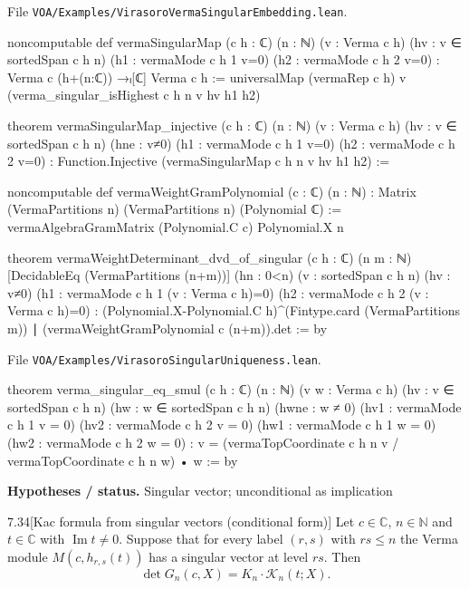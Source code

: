 \documentclass[11pt,openany]{book}
\newcommand{\leanpath}[1]{\texttt{\small #1}}
\theoremstyle{definition}
\theoremstyle{plain}
\newcommand{\C}{{\mathbb{C}}}
\newcommand{\N}{{\mathbb{N}}}
\begin{document}
{\raggedright\noindent File \leanpath{VOA/\allowbreak Examples/\allowbreak VirasoroVermaSingularEmbedding.lean}.\par}
\begin{leancode}
noncomputable def vermaSingularMap (c h : ℂ) (n : ℕ) (v : Verma c h)
    (hv : v ∈ sortedSpan c h n)
    (h1 : vermaMode c h 1 v=0) (h2 : vermaMode c h 2 v=0) :
    Verma c (h+(n:ℂ)) →ₗ[ℂ] Verma c h :=
  universalMap (vermaRep c h) v (verma_singular_isHighest c h n v hv h1 h2)

theorem vermaSingularMap_injective (c h : ℂ) (n : ℕ) (v : Verma c h)
    (hv : v ∈ sortedSpan c h n) (hne : v≠0)
    (h1 : vermaMode c h 1 v=0) (h2 : vermaMode c h 2 v=0) :
    Function.Injective (vermaSingularMap c h n v hv h1 h2) :=

noncomputable def vermaWeightGramPolynomial (c : ℂ) (n : ℕ) :
    Matrix (VermaPartitions n) (VermaPartitions n) (Polynomial ℂ) :=
  vermaAlgebraGramMatrix (Polynomial.C c) Polynomial.X n

theorem vermaWeightDeterminant_dvd_of_singular (c h : ℂ) (n m : ℕ)
    [DecidableEq (VermaPartitions (n+m))] (hn : 0<n)
    (v : sortedSpan c h n) (hv : v≠0)
    (h1 : vermaMode c h 1 (v : Verma c h)=0)
    (h2 : vermaMode c h 2 (v : Verma c h)=0) :
    (Polynomial.X-Polynomial.C h)^(Fintype.card (VermaPartitions m)) ∣
      (vermaWeightGramPolynomial c (n+m)).det := by
\end{leancode}
{\raggedright\noindent File \leanpath{VOA/\allowbreak Examples/\allowbreak VirasoroSingularUniqueness.lean}.\par}
\begin{leancode}
theorem verma_singular_eq_smul (c h : ℂ) (n : ℕ) (v w : Verma c h)
    (hv : v ∈ sortedSpan c h n) (hw : w ∈ sortedSpan c h n) (hwne : w ≠ 0)
    (hv1 : vermaMode c h 1 v = 0) (hv2 : vermaMode c h 2 v = 0)
    (hw1 : vermaMode c h 1 w = 0) (hw2 : vermaMode c h 2 w = 0) :
    v = (vermaTopCoordinate c h n v / vermaTopCoordinate c h n w) • w := by
\end{leancode}
\noindent\textbf{Hypotheses / status.} Singular vector; unconditional as implication\par
\medskip
\begin{btheorem}{7.34}[Kac formula from singular vectors (conditional form)]
Let $c\in\C$, $n\in\N$ and $t\in\C$ with $\operatorname{Im}t\ne0$. Suppose that for every label $(r,s)$ with
$rs\le n$ the Verma module $M(c,h_{r,s}(t))$ has a singular vector at level $rs$. Then
\begin{equation*}
 \det G_n(c,X) = K_n\cdot\mathcal K_n(t;X).
\end{equation*}
\end{btheorem}
\end{document}
